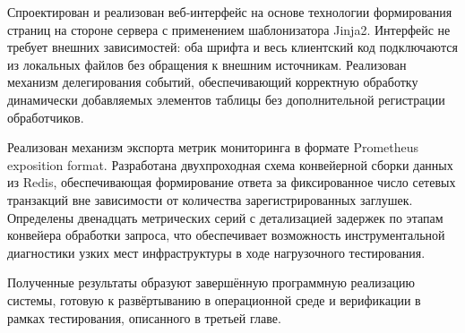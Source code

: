 Спроектирован и реализован веб-интерфейс на основе технологии формирования страниц на стороне сервера с применением шаблонизатора Jinja2. Интерфейс не требует внешних зависимостей: оба шрифта и весь клиентский код подключаются из локальных файлов без обращения к внешним источникам. Реализован механизм делегирования событий, обеспечивающий корректную обработку динамически добавляемых элементов таблицы без дополнительной регистрации обработчиков.

Реализован механизм экспорта метрик мониторинга в формате Prometheus exposition format. Разработана двухпроходная схема конвейерной сборки данных из Redis, обеспечивающая формирование ответа за фиксированное число сетевых транзакций вне зависимости от количества зарегистрированных заглушек. Определены двенадцать метрических серий с детализацией задержек по этапам конвейера обработки запроса, что обеспечивает возможность инструментальной диагностики узких мест инфраструктуры в ходе нагрузочного тестирования.

Полученные результаты образуют завершённую программную реализацию системы, готовую к развёртыванию в операционной среде и верификации в рамках тестирования, описанного в третьей главе.
